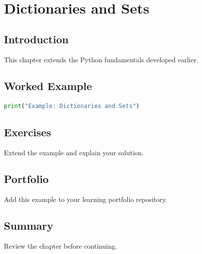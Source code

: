 \chapter{Dictionaries and Sets}
\label{chap:vol3-12}



\section{Introduction}
This chapter extends the Python fundamentals developed earlier.

\section{Worked Example}
\begin{lstlisting}[language=Python]
print("Example: Dictionaries and Sets")
\end{lstlisting}

\section{Exercises}
\begin{exercise}
Extend the example and explain your solution.
\end{exercise}

\section{Portfolio}
Add this example to your learning portfolio repository.

\section{Summary}
Review the chapter before continuing.
